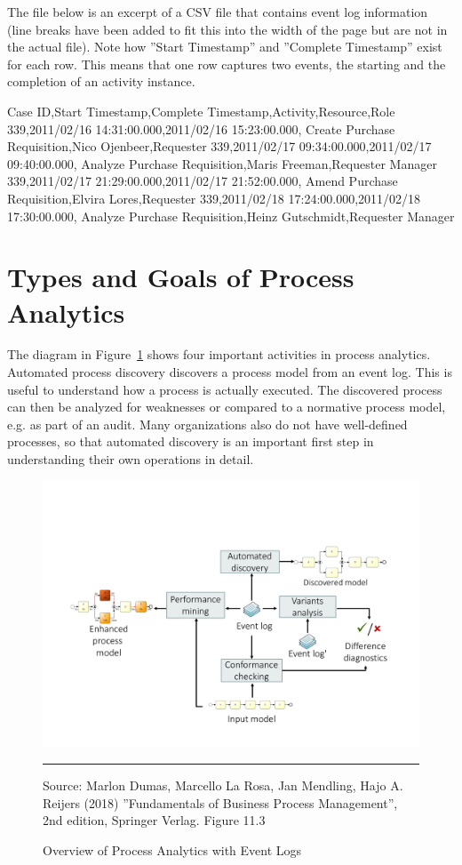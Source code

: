 The file below is an excerpt of a CSV file that contains event log information (line breaks have been added to fit this into the width of the page but are not in the actual file). Note how ''Start Timestamp'' and ''Complete Timestamp'' exist for each row. This means that one row captures two events, the starting and the completion of an activity instance. 

\begin{textcode}
Case ID,Start Timestamp,Complete Timestamp,Activity,Resource,Role
339,2011/02/16 14:31:00.000,2011/02/16 15:23:00.000,
    Create Purchase Requisition,Nico Ojenbeer,Requester
339,2011/02/17 09:34:00.000,2011/02/17 09:40:00.000,
    Analyze Purchase Requisition,Maris Freeman,Requester Manager
339,2011/02/17 21:29:00.000,2011/02/17 21:52:00.000,
    Amend Purchase Requisition,Elvira Lores,Requester
339,2011/02/18 17:24:00.000,2011/02/18 17:30:00.000,
    Analyze Purchase Requisition,Heinz Gutschmidt,Requester Manager
\end{textcode}

\section{Types and Goals of Process Analytics}

The diagram in Figure~\ref{fig:processanalytics} shows four important activities in process analytics. Automated process discovery discovers a process model from an event log. This is useful to understand how a process is actually executed. The discovered process can then be analyzed for weaknesses or compared to a normative process model, e.g. as part of an audit. Many organizations also do not have well-defined processes, so that automated discovery is an important first step in understanding their own operations in detail.

\begin{figure}
\centering
\includegraphics[width=.9\textwidth]{Chapter-11-Figure-03.pdf}\\
\vspace{3mm}\hrule\vspace{2mm}
\scriptsize{Source: Marlon Dumas, Marcello La Rosa, Jan Mendling, Hajo A. Reijers (2018) ''Fundamentals of Business Process Management'', 2nd edition, Springer Verlag. Figure 11.3}
\caption{Overview of Process Analytics with Event Logs}
\label{fig:processanalytics}
\end{figure}

